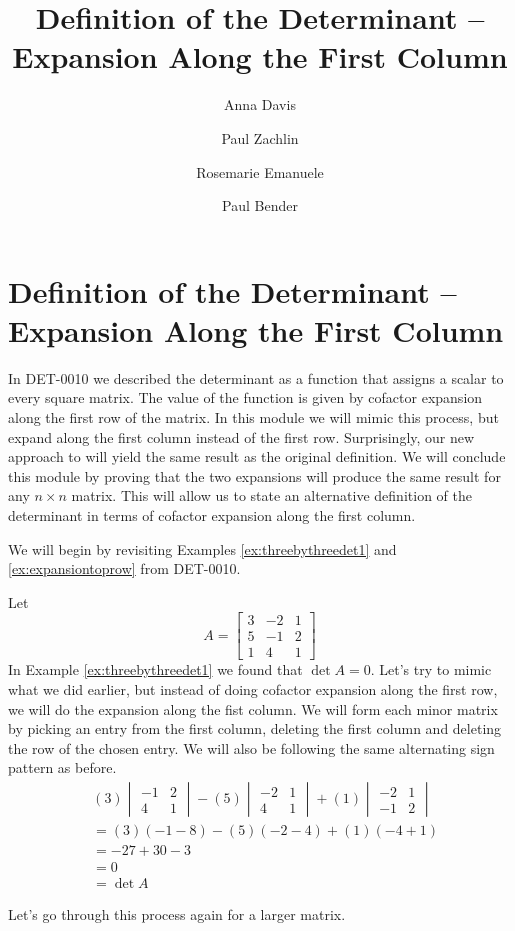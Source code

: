 \documentclass{ximera}
\author{Anna Davis \and Paul Zachlin \and Rosemarie Emanuele \and Paul Bender} \title{Definition of the Determinant -- Expansion Along the First Column} \license{CC-BY 4.0}
\begin{document}
\begin{abstract}
\end{abstract}
\maketitle

\section*{Definition of the Determinant -- Expansion Along the First Column}
In DET-0010 we described the determinant as a function that assigns a scalar to every square matrix.  The value of the function is given by cofactor expansion along the first row of the matrix.  In this module we will mimic this process, but expand along the first column instead of the first row.  Surprisingly, our new approach to will yield the same result as the original definition.  We will conclude this module by proving that the two expansions will produce the same result for any $n\times n$ matrix. This will allow us to state an alternative definition of the determinant in terms of cofactor expansion along the first column.  


We will begin by revisiting Examples \ref{ex:threebythreedet1} and \ref{ex:expansiontoprow} from DET-0010.      

\begin{exploration}\label{init:expansionfirstcol1}
Let 
$$A=\begin{bmatrix}3&-2&1\\5&-1&2\\1&4&1\end{bmatrix}$$
In Example \ref{ex:threebythreedet1} we found that $\det{A}=0$.  Let's try to mimic what we did earlier, but instead of doing cofactor expansion along the first row, we will do the expansion along the fist column.  We will form each minor matrix by picking an entry from the first column, deleting the first column and deleting the row of the chosen entry.  We will also be following the same alternating sign pattern as before.
\begin{align*}
&(3)\begin{vmatrix}-1&2\\4&1\end{vmatrix}-(5)\begin{vmatrix}-2&1\\4&1\end{vmatrix}+(1)\begin{vmatrix}-2&1\\-1&2\end{vmatrix}\\
&=(3)(-1-8)-(5)(-2-4)+(1)(-4+1)\\
&=-27+30-3\\
&=0\\
&=\det{A}
\end{align*}
\end{exploration}
Let's go through this process again for a larger matrix.
\end{document}
